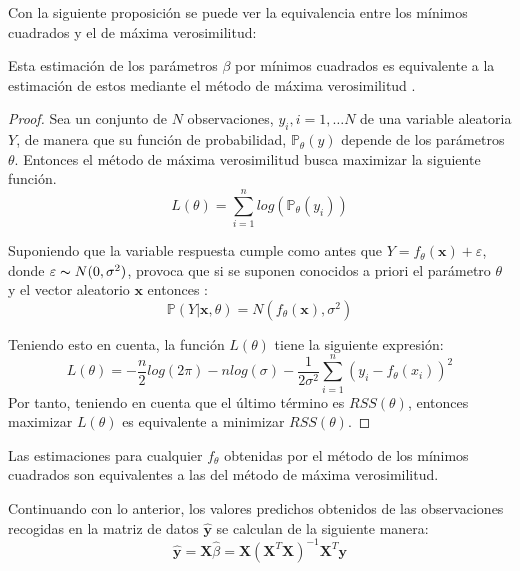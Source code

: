 \noindent Con la siguiente proposición se puede ver la equivalencia entre los mínimos cuadrados y el de máxima verosimilitud:

\begin{propo}
Esta estimación de los parámetros $\beta$ por mínimos cuadrados es equivalente a la estimación de estos mediante el método de máxima verosimilitud \cite{Hastie 2001}.
\begin{proof}
Sea un conjunto de $N$ observaciones, $y_i, i=1,\ldots N$ de una variable aleatoria $Y$, de manera que su función de probabilidad, $\mathbb{P}_\theta(y)$ depende de los parámetros $\theta$. Entonces el método de máxima verosimilitud busca maximizar la siguiente función.
\begin{equation}
L(\theta)=\sum_{i=1}^n log( \mathbb{P}_{\theta}(y_i))
\end{equation}

\noindent Suponiendo que la variable respuesta cumple como antes que  $Y=f_\theta (\textbf{x})+\varepsilon$, donde $\varepsilon \thicksim N(0,\sigma^2)$, provoca que si se suponen conocidos a priori el parámetro $\theta$ y el vector aleatorio $\textbf{x}$ entonces :
\begin{equation}
\mathbb{P}(Y|\textbf{x},\theta)=N(f_\theta(\textbf{x}), \sigma^2)
\end{equation}

\noindent Teniendo esto en cuenta, la función $L(\theta)$ tiene la siguiente expresión:
\begin{equation}
L(\theta)=-\dfrac{n}{2}log(2\pi)-n log(\sigma)-\dfrac{1}{2\sigma^2}\sum_{i=1}^n (y_i-f_\theta (x_i))^2
\end{equation}
Por tanto, teniendo en cuenta que el último término es $RSS(\theta)$, entonces maximizar $L(\theta)$ es equivalente a minimizar $RSS(\theta)$.
\end{proof}
\end{propo}
\begin{coro}
Las estimaciones para cualquier $f_{\theta}$ obtenidas por el método de los mínimos cuadrados son equivalentes a las del método de máxima verosimilitud.  
\end{coro}
\noindent Continuando con lo anterior, los valores predichos obtenidos de las observaciones recogidas en la matriz de datos $\hat{\textbf{y}}$ se calculan de la siguiente manera:
\begin{equation}
\hat{\textbf{y}}=\textbf{X}\hat{\beta}=\textbf{X}(\textbf{X}^T\textbf{X})^{-1}\textbf{X}^T\textbf{y}
\end{equation}


